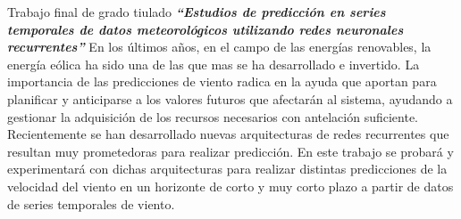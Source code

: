 

\vspace{1\baselineskip}
Trabajo final de grado tiulado \textbf{\textit{“Estudios de predicción en series temporales de datos meteorológicos utilizando redes neuronales recurrentes” }}\cite{montesdeoca2016estudios}
En los últimos años, en el campo de las energías renovables, la energía eólica ha sido una de las que mas se ha desarrollado e invertido. La importancia de las predicciones de viento radica en la ayuda que aportan para planificar y anticiparse a los valores futuros que afectarán al sistema, ayudando a gestionar la adquisición de los recursos necesarios con antelación suficiente. Recientemente se han desarrollado nuevas arquitecturas de redes recurrentes que resultan muy prometedoras para realizar predicción. En este trabajo se probará y experimentará con dichas arquitecturas para realizar distintas predicciones de la velocidad del viento en un horizonte de corto y muy corto plazo a partir de datos de series temporales de viento.

